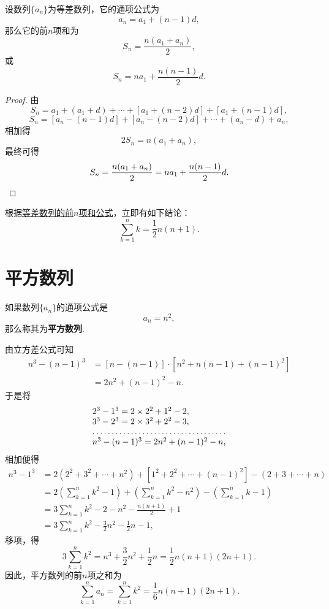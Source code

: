 \begin{property}[等差数列求和]
设数列\(\{a_n\}\)为等差数列，它的通项公式为\[
    a_n = a_1 + (n-1) d,
\]
那么它的前\(n\)项和为\begin{equation}\label{equation:数列.等差数列的前n项和1}
    S_n = \frac{n(a_1 + a_n)}{2},
\end{equation}
或\begin{equation}\label{equation:数列.等差数列的前n项和2}
    S_n = n a_1 + \frac{n(n-1)}{2} d.
\end{equation}
\begin{proof}
由\[
    S_n = a_1 + (a_1 + d) + \dotsb + [a_1 + (n-2)d] + [a_1 + (n-1)d],
\]\[
    S_n = [a_n - (n-1)d] + [a_n - (n-2)d] + \dotsb + (a_n - d) + a_n,
\]相加得\[
    2 S_n = n(a_1 + a_n),
\]最终可得\[
    S_n = \frac{n(a_1 + a_n)}{2} = n a_1 + \frac{n(n-1)}{2} d.
    \qedhere
\]
\end{proof}
\end{property}

根据\hyperref[equation:数列.等差数列的前n项和1]{等差数列的前\(n\)项和公式}，立即有如下结论：
\begin{equation}
    \sum\limits_{k=1}^n k = \frac{1}{2} n(n+1).
\end{equation}

\section{平方数列}
如果数列\(\{a_n\}\)的通项公式是\[
a_n = n^2,
\]那么称其为\textbf{平方数列}.

由立方差公式可知
\[\begin{aligned}
n^3 - (n-1)^3
&= [n - (n-1)] \cdot [n^2 + n(n-1) + (n-1)^2] \\
&= 2n^2 + (n-1)^2 - n.
\end{aligned}\]于是将\[
\begin{array}{l}
2^3 - 1^3 = 2\times2^2+1^2-2, \\
3^3 - 2^3 = 2\times3^2+2^2-3, \\
\hdotsfor{1} \\
n^3 - (n-1)^3 = 2n^2 + (n-1)^2 - n,
\end{array}
\]相加便得\[\begin{aligned}
n^3 - 1^3
&= 2(2^2+3^2+\dotsb+n^2) + [1^2+2^2+\dotsb+(n-1)^2] - (2+3+\dotsb+n) \\
&= 2\left(\sum\limits_{k=1}^n k^2 - 1\right)
    + \left(\sum\limits_{k=1}^n k^2 - n^2\right)
    - \left(\sum\limits_{k=1}^n k - 1\right) \\
&= 3\sum\limits_{k=1}^n k^2 - 2 - n^2 - \frac{n(n+1)}{2} + 1 \\
&= 3\sum\limits_{k=1}^n k^2 - \frac{3}{2} n^2 - \frac{1}{2} n - 1,
\end{aligned}\]
移项，得\[
3 \sum\limits_{k=1}^n k^2
= n^3 + \frac{3}{2} n^2 + \frac{1}{2} n
= \frac{1}{2} n (n+1) (2n+1).
\]
因此，平方数列的前\(n\)项之和为
\begin{equation}
\sum\limits_{k=1}^n a_n
= \sum\limits_{k=1}^n k^2
= \frac{1}{6} n(n+1)(2n+1).
\end{equation}

